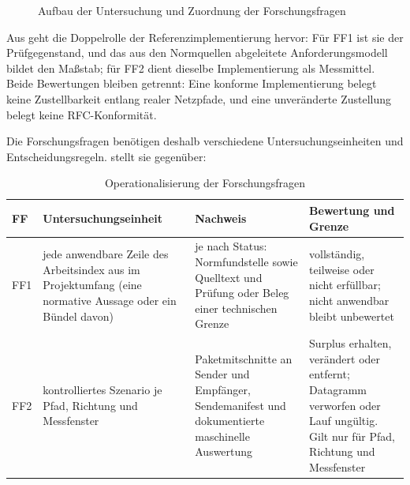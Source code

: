 \begin{figure}[H]
  \caption{Aufbau der Untersuchung und Zuordnung der Forschungsfragen}
  \label{fig:forschungsdesign}
\end{figure}

Aus  geht die Doppelrolle der Referenzimplementierung hervor: Für FF1 ist sie der
Prüfgegenstand, und das aus den Normquellen abgeleitete Anforderungsmodell bildet den Maßstab; für FF2 dient
dieselbe Implementierung als Messmittel. Beide Bewertungen bleiben getrennt: Eine konforme Implementierung
belegt keine Zustellbarkeit entlang realer Netzpfade, und eine unveränderte Zustellung belegt keine
RFC-Konformität.

Die Forschungsfragen benötigen deshalb verschiedene Untersuchungseinheiten und Entscheidungsregeln.
 stellt sie gegenüber:

\begin{table}[htbp]
  \centering
  \caption{Operationalisierung der Forschungsfragen}
  \label{tab:operationalisierung}
  \small
  \begin{tabularx}{\textwidth}{@{}L{0.7cm}L{3.2cm}YL{4.4cm}@{}}
    \toprule
    \textbf{FF} & \textbf{Untersuchungseinheit} & \textbf{Nachweis} & \textbf{Bewertung und Grenze} \\
    \midrule
    FF1
      & jede anwendbare Zeile des Arbeitsindex aus  im Projektumfang
        (eine normative Aussage oder ein Bündel davon)
      & je nach Status: Normfundstelle sowie Quelltext und Prüfung oder Beleg einer technischen Grenze
      & vollständig, teilweise oder nicht erfüllbar; nicht anwendbar bleibt unbewertet \\
    FF2
      & kontrolliertes Szenario je Pfad, Richtung und Messfenster
      & Paketmitschnitte an Sender und Empfänger, Sendemanifest und dokumentierte maschinelle Auswertung
      & Surplus erhalten, verändert oder entfernt; Datagramm verworfen oder Lauf ungültig. Gilt nur für Pfad,
        Richtung und Messfenster \\
    \bottomrule
  \end{tabularx}
\end{table}

